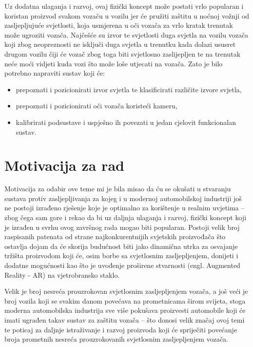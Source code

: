 \documentclass{foi}
\begin{document}
Uz dodatna ulaganja i razvoj, ovaj fizički koncept može postati vrlo popularan i koristan proizvod svakom vozaču u vozilu jer će pružiti zaštitu u noćnoj vožnji od zasljepljujuće svjetlosti, koja usmjerena u oči vozača za vrlo kratak trenutak može ugroziti vozača. Najčešće su izvor te svjetlosti duga svjetla na vozilu vozača koji zbog neopreznosti ne isključi duga svjetla u trenutku kada dolazi ususret drugom vozilu čiji će vozač zbog toga biti svjetlosno zaslijepljen te na trenutak neće moći vidjeti kuda vozi što može loše utjecati na vozača. Zato je bilo potrebno napraviti sustav koji će:
\begin{itemize}[noitemsep]
    \item prepoznati i pozicionirati izvor svjetla te klasificirati različite izvore svjetla,
    \item prepoznati i pozicionirati oči vozača koristeći kameru,
    \item kalibrirati podsustave i uspješno ih povezati u jedan cjelovit funkcionalan sustav.
\end{itemize}

\pagebreak
\section{Motivacija za rad}

Motivacija za odabir ove teme mi je bila misao da ću se okušati u stvaranju sustava protiv zasljepljivanja za kojeg i u modernoj automobilskoj industriji još ne postoji izrađeno rješenje koje je optimalno za korištenje u realnim uvjetima – zbog čega sam gore i rekao da bi uz daljnja ulaganja i razvoj,  fizički koncept koji je izrađen u svrhu ovog završnog rada mogao biti popularan. Postoji velik broj raspisanih patenata od strane najkonkurentnijih svjetskih proizvođača što ostavlja dojam da će skorija budućnost biti jako dinamična utrka za osvajanje tržišta proizvodom koji će, osim borbe sa svjetlosnim zasljepljenjem, donijeti i dodatne mogućnosti kao što je uvođenje proširene stvarnosti (engl. Augmented Reality - AR) na vjetrobransko staklo.

Velik je broj nesreća prouzrokovan svjetlosnim zasljepljenjem vozača, a još veći je broj vozila koji se svakim danom povećava na prometnicama širom svijeta, stoga moderna automobilska industrija sve više pokušava proizvesti automobile koji će imati ugrađen takav sustav za zaštitu vozača – što donosi velik značaj ovoj temi te poticaj za daljnje istraživanje i razvoj proizvoda koji će spriječiti povećanje broja prometnih nesreća prouzrokovanih svjetlosnim zasljepljenjem vozača.
\end{document}
